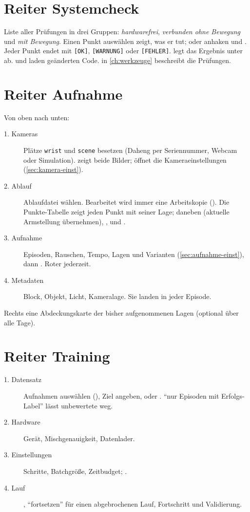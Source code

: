 \section{Reiter Systemcheck}

Liste aller Prüfungen in drei Gruppen: \emph{hardwarefrei}, \emph{verbunden ohne Bewegung} und
\emph{mit Bewegung}. Einen Punkt auswählen zeigt, was er tut; 
oder anhaken und . Jeder Punkt endet mit
\texttt{[OK]}, \texttt{[WARNUNG]} oder \texttt{[FEHLER]}.  legt das
Ergebnis unter  ab.  und
 laden geänderten Code.  in
\cref{ch:werkzeuge} beschreibt die Prüfungen.

\section{Reiter Aufnahme}

Von oben nach unten:
\begin{description}
  \item[1. Kameras] Plätze \texttt{wrist} und \texttt{scene} besetzen (Daheng per
    Seriennummer, Webcam oder Simulation).  zeigt beide Bilder;
     öffnet die Kameraeinstellungen (\cref{sec:kamera-einst}).
  \item[2. Ablauf] Ablaufdatei wählen. Bearbeitet wird immer eine Arbeitskopie
    (). Die Punkte-Tabelle zeigt jeden Punkt mit seiner Lage;
    daneben  (aktuelle Armstellung übernehmen), ,
     und .
  \item[3. Aufnahme] Episoden, Rauschen, Tempo, Lagen und Varianten
    (\cref{sec:aufnahme-einst}), dann . Roter  jederzeit.
  \item[4. Metadaten] Block, Objekt, Licht, Kameralage. Sie landen in jeder Episode.
\end{description}
Rechts eine Abdeckungskarte der bisher aufgenommenen Lagen (optional über alle Tage).

\section{Reiter Training}

\begin{description}
  \item[1. Datensatz] Aufnahmen auswählen (), Ziel angeben,
     oder . \enquote{nur Episoden mit Erfolgs-Label} lässt
    unbewertete weg.
  \item[2. Hardware] Gerät, Mischgenauigkeit, Datenlader.
  \item[3. Einstellungen] Schritte, Batchgröße, Zeitbudget; .
  \item[4. Lauf] , \enquote{fortsetzen} für einen abgebrochenen Lauf,
    Fortschritt und Validierung.
\end{description}

